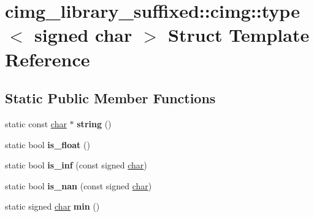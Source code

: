 \hypertarget{structcimg__library__suffixed_1_1cimg_1_1type_3_01signed_01char_01_4}{}\section{cimg\+\_\+library\+\_\+suffixed\+:\+:cimg\+:\+:type$<$ signed char $>$ Struct Template Reference}
\label{structcimg__library__suffixed_1_1cimg_1_1type_3_01signed_01char_01_4}
\subsection*{Static Public Member Functions}
\begin{DoxyCompactItemize}
\item 
\mbox{\label{structcimg__library__suffixed_1_1cimg_1_1type_3_01signed_01char_01_4_a93337b859be2b9f4e9f6cc59d34169ca}} 
static const \hyperlink{classchar}{char} $\ast$ {\bfseries string} ()
\item 
\mbox{\label{structcimg__library__suffixed_1_1cimg_1_1type_3_01signed_01char_01_4_a33984df309cbb5fdd092f180ac71e27b}} 
static bool {\bfseries is\+\_\+float} ()
\item 
\mbox{\label{structcimg__library__suffixed_1_1cimg_1_1type_3_01signed_01char_01_4_a43bb70583e87355f035ca8cd3944006c}} 
static bool {\bfseries is\+\_\+inf} (const signed \hyperlink{classchar}{char})
\item 
\mbox{\label{structcimg__library__suffixed_1_1cimg_1_1type_3_01signed_01char_01_4_af7e8db406be150a1674d57f6c57ad634}} 
static bool {\bfseries is\+\_\+nan} (const signed \hyperlink{classchar}{char})
\item 
\mbox{\label{structcimg__library__suffixed_1_1cimg_1_1type_3_01signed_01char_01_4_a8482b4ba4ba2d0abe0836794510ec37f}} 
static signed \hyperlink{classchar}{char} {\bfseries min} ()
\item 

\end{DoxyCompactItemize}
